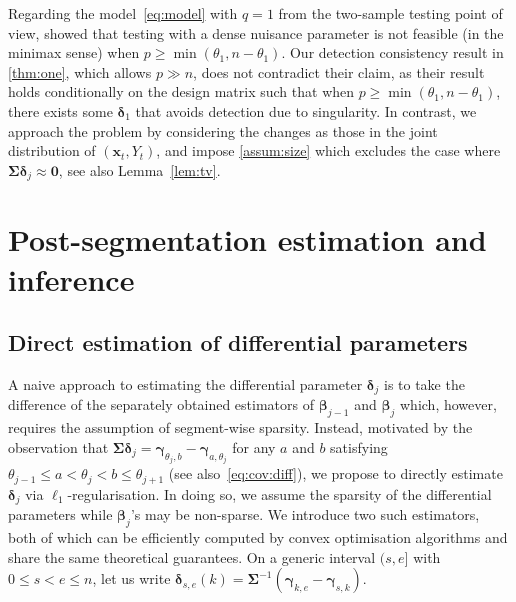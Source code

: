 \documentclass[11pt, a4paper]{article}
\newcommand{\mbf}{\mathbf}
\newcommand{\cp}{\theta}
\theoremstyle{definition}
\theoremstyle{definition}
\theoremstyle{definition}
\theoremstyle{definition}
\theoremstyle{definition}
\theoremstyle{remark}
\theoremstyle{definition}
\theoremstyle{definition}
\theoremstyle{definition}
\begin{document}
Regarding the model~\eqref{eq:model} with $q = 1$ from the two-sample testing point of view, \cite[Proposition~9]{gao2022two} showed that testing with a dense nuisance parameter is not feasible (in the minimax sense) when $p \ge \min(\cp_1, n - \cp_1)$.  Our detection consistency result in \cref{thm:one}, which allows $p \gg n$, does not contradict their claim, as their result holds conditionally on the design matrix such that when $p \ge \min(\cp_1, n - \cp_1)$, there exists some $\bm\delta_1$ that avoids detection due to singularity. In contrast, we approach the problem by considering the changes as those in the joint distribution of $(\mbf x_t, Y_t)$, and impose \cref{assum:size} which excludes the case where $\bm\Sigma \bm\delta_j \approx \mbf 0$, see also Lemma~\ref{lem:tv}.


\section{Post-segmentation estimation and inference}
\label{sec:diff}

\subsection{Direct estimation of differential parameters}
\label{sec:diff:est}

A naive approach to estimating the differential parameter $\bm\delta_j$ is to take the difference of the separately obtained estimators of $\bm\beta_{j - 1}$ and $\bm\beta_j$ which, however, requires the assumption of segment-wise sparsity. 
Instead, motivated by the observation that 
$\bm\Sigma \bm\delta_j = \bm\gamma_{\cp_j, b} - \bm\gamma_{a, \cp_j}$ for any $a$ and $b$ satisfying $\cp_{j - 1} \le a < \cp_j < b \le \cp_{j + 1}$ (see also~\eqref{eq:cov:diff}),
we propose to directly estimate $\bm\delta_j$ via $\ell_1$-regularisation. 
In doing so, we assume the sparsity of the differential parameters while $\bm\beta_j$'s may be non-sparse. 
We introduce two such estimators, both of which can be efficiently computed by convex optimisation algorithms and share the same theoretical guarantees. 
On a generic interval $(s, e]$ with $0 \le s < e \le n$, let us write $\bm\delta_{s, e}(k) = \bm\Sigma^{-1} (\bm\gamma_{k, e} - \bm\gamma_{s, k})$.
\smallskip
\end{document}
